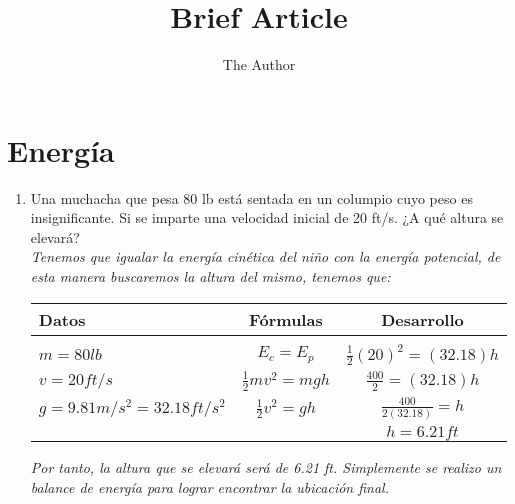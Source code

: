 \documentclass[11pt]{article} %
\title{Brief Article}
\author{The Author}
\begin{document}
\maketitle

\section{Energía}
\begin{enumerate}
\item Una muchacha que pesa 80 lb está sentada en un columpio  cuyo peso es insignificante. Si se imparte una velocidad inicial de 20 ft/s. ¿A qué altura se elevará?\\
\emph{Tenemos que igualar la energía cinética del niño con la energía potencial, de esta manera buscaremos la altura del mismo, tenemos que:}\\
\begin{tabular}{lcc}
Datos & Fórmulas & Desarrollo\\
\hline\\
$m = 80 lb$ & $E_c = E_p$ & $\frac{1}{2}(20)^2 = (32.18)h$\\
$v = 20 ft/s$ & $\frac{1}{2}mv^2 = mgh$ & $\frac{400}{2} = (32.18)h$\\
$g = 9.81 m/s^2 = 32.18ft/s^2$ & $\frac{1}{2}v^2 = gh$ & $\frac{400}{2(32.18)} = h$\\
& & $h = 6.21 ft$
\end{tabular}

\emph{Por tanto, la altura que se elevará será de 6.21 ft. Simplemente se realizo un balance de energía para lograr encontrar la ubicación final.}
\end{enumerate}
\end{document}
